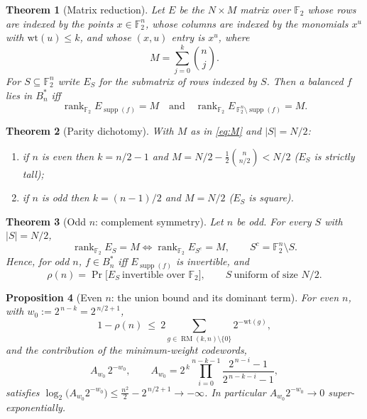 \documentclass{amsart}
\newtheorem{theorem}{Theorem}
\newtheorem{proposition}[theorem]{Proposition}
\theoremstyle{definition}
\DeclareMathOperator{\supp}{supp}
\DeclareMathOperator{\RM}{RM}
\DeclareMathOperator{\rank}{rank}
\newcommand{\F}{\mathbb{F}}
\begin{document}
\begin{theorem}[Matrix reduction]\label{thm:reduction}
Let $E$ be the $N\times M$ matrix over $\F_2$ whose rows are indexed by the
points $x\in\F_2^n$, whose columns are indexed by the monomials $x^{u}$
with $\mathrm{wt}(u)\le k$, and whose $(x,u)$ entry is $x^{u}$, where
\begin{equation}\label{eq:M}
M=\sum_{j=0}^{k}\binom nj .
\end{equation}
For $S\subseteq\F_2^n$ write $E_S$ for the submatrix of rows indexed by
$S$. Then a balanced $f$ lies in $B_n^*$ iff
\[
\rank_{\F_2}E_{\supp(f)}=M\quad\text{and}\quad
\rank_{\F_2}E_{\,\F_2^n\setminus\supp(f)}=M .
\]
\end{theorem}

\begin{theorem}[Parity dichotomy]\label{thm:dichotomy}
With $M$ as in \eqref{eq:M} and $|S|=N/2$:
\begin{enumerate}
\item if $n$ is even then $k=n/2-1$ and $M=N/2-\tfrac12\binom n{n/2}<N/2$
      ($E_S$ is strictly tall);
\item if $n$ is odd then $k=(n-1)/2$ and $M=N/2$ ($E_S$ is square).
\end{enumerate}
\end{theorem}

\begin{theorem}[Odd $n$: complement symmetry]\label{thm:odd-sym}
Let $n$ be odd. For every $S$ with $|S|=N/2$,
\[
\rank_{\F_2}E_S=M\iff \rank_{\F_2}E_{S^c}=M,\qquad S^c=\F_2^n\setminus S.
\]
Hence, for odd $n$, $f\in B_n^*$ iff $E_{\supp(f)}$ is invertible, and
\begin{equation}\label{eq:odd-rho}
\rho(n)=\Pr\bigl[E_{S}\ \text{invertible over }\F_2\bigr],\qquad
S\ \text{uniform of size }N/2 .
\end{equation}
\end{theorem}

\begin{proposition}[Even $n$: the union bound and its dominant term]
\label{prop:evenmin}
For even $n$, with $w_0:=2^{\,n-k}=2^{\,n/2+1}$,
\begin{equation}\label{eq:even-bound}
1-\rho(n)\ \le\ 2\sum_{g\in\RM(k,n)\setminus\{0\}}2^{-\mathrm{wt}(g)},
\end{equation}
and the contribution of the minimum-weight codewords,
\[
A_{w_0}\,2^{-w_0},\qquad
A_{w_0}=2^{\,k}\prod_{i=0}^{n-k-1}\frac{2^{\,n-i}-1}{2^{\,n-k-i}-1},
\]
satisfies $\log_2\bigl(A_{w_0}2^{-w_0}\bigr)\le \tfrac{n^2}{2}-2^{\,n/2+1}
\to-\infty$. In particular $A_{w_0}2^{-w_0}\to0$ super-exponentially.
\end{proposition}
\end{document}
